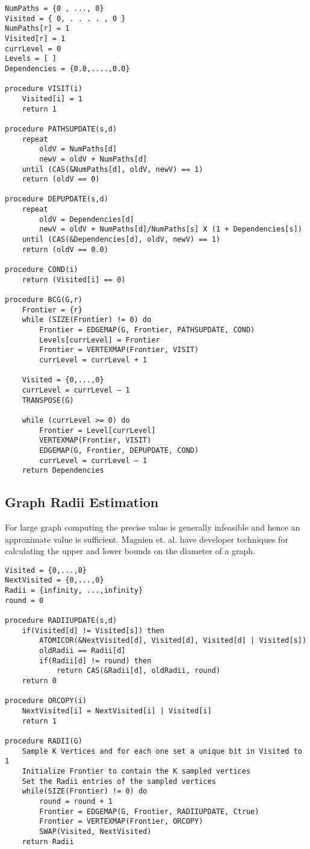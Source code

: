 \documentclass[a4paper,10pt,twoside]{article}
\begin{document}
\begin{lstlisting}NumPaths = {0 , ..., 0}
Visited = { 0, . . . . , 0 }
NumPaths[r] = 1
Visited[r] = 1
currLevel = 0
Levels = [ ]
Dependencies = {0.0,....,0.0}

procedure VISIT(i)
	Visited[i] = 1
	return 1

procedure PATHSUPDATE(s,d)
	repeat
		oldV = NumPaths[d]
		newV = oldV + NumPaths[d]
	until (CAS(&NumPaths[d], oldV, newV) == 1)
	return (oldV == 0)

procedure DEPUPDATE(s,d)
	repeat
		oldV = Dependencies[d]
		newV = oldV + NumPaths[d]/NumPaths[s] X (1 + Dependencies[s])
	until (CAS(&Dependencies[d], oldV, newV) == 1)
	return (oldV == 0.0)

procedure COND(i)
	return (Visited[i] == 0)

procedure BCG(G,r)
	Frontier = {r}
	while (SIZE(Frontier) != 0) do
		Frontier = EDGEMAP(G, Frontier, PATHSUPDATE, COND)
		Levels[currLevel] = Frontier
		Frontier = VERTEXMAP(Frontier, VISIT)
		currLevel = currLevel + 1

	Visited = {0,...,0}
	currLevel = currLevel – 1
	TRANSPOSE(G)

	while (currLevel >= 0) do
		Frontier = Level[currLevel]
		VERTEXMAP(Frontier, VISIT)
		EDGEMAP(G, Frontier, DEPUPDATE, COND)
		currLevel = currLevel – 1
	return Dependencies

\end{lstlisting}


\subsection{Graph Radii Estimation}
For large graph computing the precise value is generally infeasible and hence an approximate value is sufficient. Magnien et. al. have developer techniques for calculating the upper and lower bounds on the diameter of a graph. 

\begin{lstlisting}
Visited = {0,...,0}
NextVisited = {0,...,0}
Radii = {infinity, ...,infinity}
round = 0

procedure RADIIUPDATE(s,d)
	if(Visited[d] != Visited[s]) then
		ATOMICOR(&NextVisited[d], Visited[d], Visited[d] | Visited[s])
		oldRadii == Radii[d]
		if(Radii[d] != round) then
			return CAS(&Radii[d], oldRadii, round)
	return 0

procedure ORCOPY(i)
	NextVisited[i] = NextVisited[i] | Visited[i]
	return 1

procedure RADII(G)
	Sample K Vertices and for each one set a unique bit in Visited to 1
	Initialize Frontier to contain the K sampled vertices
	Set the Radii entries of the sampled vertices
	while(SIZE(Frontier) != 0) do
		round = round + 1
		Frontier = EDGEMAP(G, Frontier, RADIIUPDATE, Ctrue)
		Frontier = VERTEXMAP(Frontier, ORCOPY)
		SWAP(Visited, NextVisited)
	return Radii

\end{lstlisting}
\end{document}
